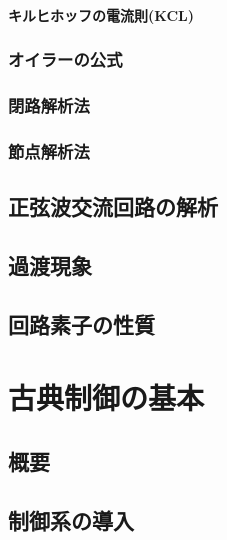 \documentclass{ltjsreport}
\begin{document}
\subsubsection{キルヒホッフの電流則(KCL)}

\subsection{オイラーの公式}

\subsection{閉路解析法}

\subsection{節点解析法}
















\section{正弦波交流回路の解析}

\section{過渡現象}

\section{回路素子の性質}




\chapter{古典制御の基本}

\section{概要}

\section{制御系の導入}
\end{document}
